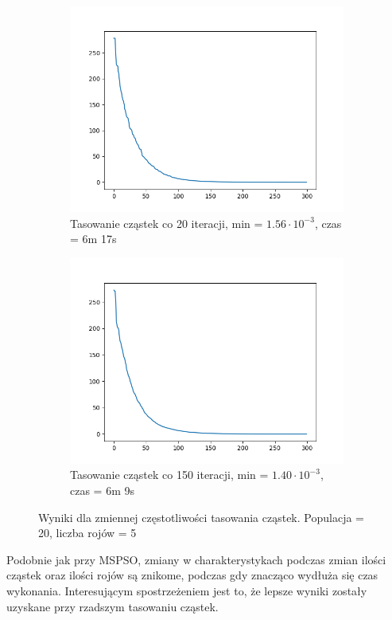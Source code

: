 \documentclass[12pt]{article}
\begin{document}
\begin{figure}[H]
    \centering
    \begin{subfigure}{0.49\textwidth}
        \centering
        \includegraphics[width=\linewidth]{plots/MPSO/5_best.png}
        \caption{Tasowanie cząstek co 20 iteracji, min = $1.56\cdot 10^{-3}$, czas = 6m 17s}
    \end{subfigure}
    \begin{subfigure}{0.49\textwidth}
        \centering
        \includegraphics[width=\linewidth]{plots/MPSO/6_best.png}
        \caption{Tasowanie cząstek co 150 iteracji, min = $1.40\cdot 10^{-3}$, czas = 6m 9s}
    \end{subfigure}
    \caption{Wyniki dla zmiennej częstotliwości tasowania cząstek. Populacja = 20, liczba rojów = 5}
\end{figure}
Podobnie jak przy MSPSO, zmiany w charakterystykach podczas zmian ilości cząstek oraz ilości rojów są znikome, podczas gdy znacząco wydłuża się czas wykonania. Interesującym spostrzeżeniem jest to, że lepsze wyniki zostały uzyskane przy rzadszym tasowaniu cząstek.
\end{document}
